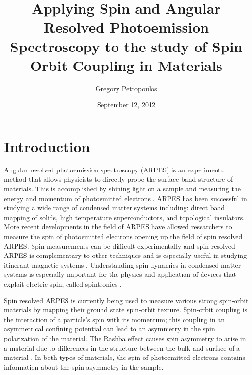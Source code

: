 \documentclass[12pt]{article}
\begin{document}
\title{Applying Spin and Angular Resolved Photoemission Spectroscopy to the study of Spin Orbit Coupling in Materials}
\author{Gregory Petropoulos}
\date{September 12, 2012}
\maketitle
{}

\section{Introduction}
Angular resolved photoemission spectroscopy (ARPES) is an experimental method that allows physicists to directly probe the surface band structure of materials.
This is accomplished by shining light on a sample and measuring the energy and momentum of photoemitted electrons \cite{Damascelli}.
ARPES has been successful in studying a wide range of condensed matter systems including:  direct band mapping of solids,  high temperature superconductors, and topological insulators.
More recent developments in the field of ARPES have allowed researchers to measure the spin of photoemitted electrons \cite{Dil, Osterwalder} opening up the field of spin resolved ARPES.
Spin measurements can be difficult experimentally and spin resolved ARPES is complementary to other techniques and is especially useful in studying itinerant magnetic systems \cite{Osterwalder}.
Understanding spin dynamics in condensed matter systems is especially important for the physics and application of devices that exploit electric spin, called spintronics \cite{wolf}.

Spin resolved ARPES is currently being used to measure various strong spin-orbit materials by mapping their ground state spin-orbit texture.
Spin-orbit coupling is the interaction of a particle's spin with its momentum; this coupling in an asymmetrical confining potential can lead to an asymmetry in the spin polarization of the material.
The Rashba effect causes spin asymmetry to arise in a material due to differences in the structure between the bulk and surface of a material \cite{Dil}.
In both types of materials, the spin of photoemitted electrons contains information about the spin asymmetry in the sample.
\end{document}
